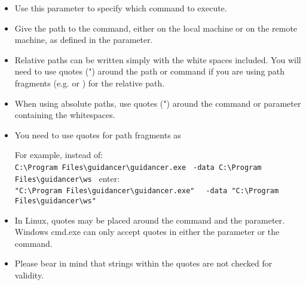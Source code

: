 
\begin{itemize}
\item Use this parameter to specify which command to execute.
\item Give the path to the command, either on the local machine or on the remote machine, as defined in the  parameter. 
\item Relative paths can be written simply with the white spaces included. You will need to use quotes (") around the path or command if you are using path fragments (e.g.  or ) for the relative path.  
\item When using absolute paths, use quotes (") around the command or parameter containing the whitespaces. 
\item You need to use quotes for path fragments as 

For example, instead of: \\
\verb+C:\Program Files\guidancer\guidancer.exe +
\newline
\verb+-data C:\Program Files\guidancer\ws +
\newline
enter:\\
\verb+"C:\Program Files\guidancer\guidancer.exe" +
\newline
\verb+ -data "C:\Program Files\guidancer\ws" +

\item In Linux, quotes may be placed around the command and the parameter. Windows cmd.exe can only accept quotes in either the parameter or the command. 
\item Please bear in mind that strings within the quotes are not checked for validity. 

\end{itemize}

